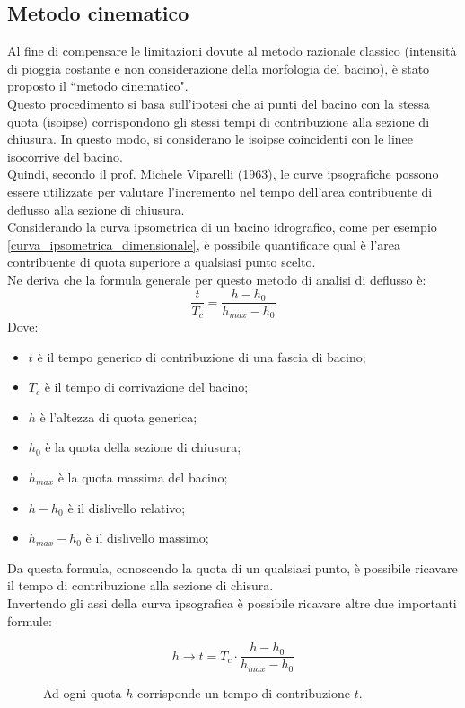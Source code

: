 \subsection{Metodo cinematico}
Al fine di compensare le limitazioni dovute al metodo razionale classico (intensità di pioggia costante e non considerazione della morfologia del bacino), è stato proposto il ``metodo cinematico".\\
Questo procedimento si basa sull'ipotesi che ai punti del bacino con la stessa quota (isoipse) corrispondono gli stessi tempi di contribuzione alla sezione di chiusura. In questo modo, si considerano le isoipse coincidenti con le linee isocorrive del bacino.\\
Quindi, secondo il prof. Michele Viparelli (1963), le curve ipsografiche possono essere utilizzate per valutare l'incremento nel tempo dell'area contribuente di deflusso alla sezione di chiusura.\\
Considerando la curva ipsometrica di un bacino idrografico, come per esempio \ref{curva_ipsometrica_dimensionale}, è possibile quantificare qual è l'area contribuente di quota superiore a qualsiasi punto scelto.\\
Ne deriva che la formula generale per questo metodo di analisi di deflusso è:
\begin{equation}
    \frac{t}{T_c} = \frac{h - h_0}{h_{max} - h_0}
    \label{formula_generica_metodo_cinematico}
\end{equation}
Dove:
\begin{itemize}
    \item $t$ è il tempo generico di contribuzione di una fascia di bacino;
    \item $T_c$ è il tempo di corrivazione del bacino;
    \item $h$ è l'altezza di quota generica;
    \item $h_0$ è la quota della sezione di chiusura;
    \item $h_{max}$ è la quota massima del bacino;
    \item $h - h_0$ è il dislivello relativo;
    \item $h_{max}-h_0$ è il dislivello massimo;
\end{itemize}
Da questa formula, conoscendo la quota di un qualsiasi punto, è possibile ricavare il tempo di contribuzione alla sezione di chisura.\\
Invertendo gli assi della curva ipsografica è possibile ricavare altre due importanti formule:

\begin{figure}[H]
\begin{equation}
    h \rightarrow t= T_c \cdot \frac{h - h_0}{h_{max} - h_0}
    \label{h_tcontribuzione}
\end{equation}
\caption*{Ad ogni quota $h$ corrisponde un tempo di contribuzione $t$.}
\end{figure}

